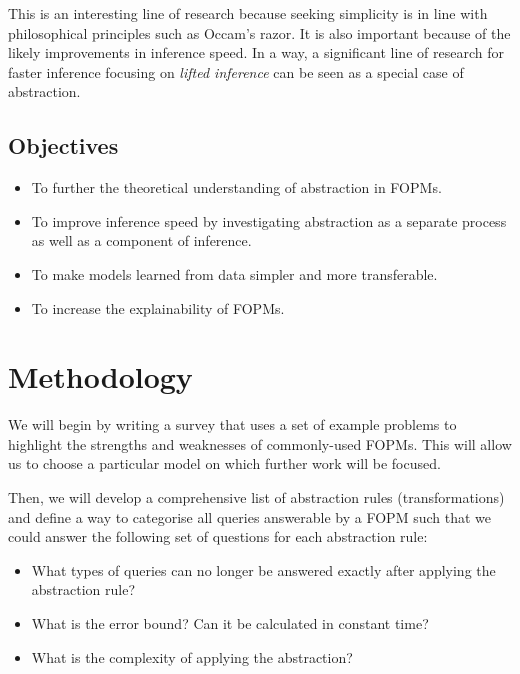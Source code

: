 \documentclass[11pt,english,twocolumn]{article}
\begin{document}
This is an interesting line of research because seeking simplicity is in line
with philosophical principles such as Occam's razor. It is also important
because of the likely improvements in inference speed. In a way, a significant
line of research for faster inference focusing on \emph{lifted inference} can be
seen as a special case of abstraction.

\subsection{Objectives}

\begin{itemize}
\item To further the theoretical understanding of abstraction in FOPMs.
\item To improve inference speed by investigating abstraction as a separate
  process as well as a component of inference.
\item To make models learned from data simpler and more transferable.
\item To increase the explainability of FOPMs.
\end{itemize}


\section{Methodology}


We will begin by writing a survey that uses a set of example problems to
highlight the strengths and weaknesses of commonly-used FOPMs. This will allow
us to choose a particular model on which further work will be focused.

Then, we will develop a comprehensive list of abstraction rules
(transformations) and define a way to categorise all queries answerable by a
FOPM such that we could answer the following set of questions for each
abstraction rule:
\begin{itemize}
\item What types of queries can no longer be answered exactly after applying the
  abstraction rule?
\item What is the error bound? Can it be calculated in constant time?
\item What is the complexity of applying the abstraction?
\end{itemize}
\end{document}
